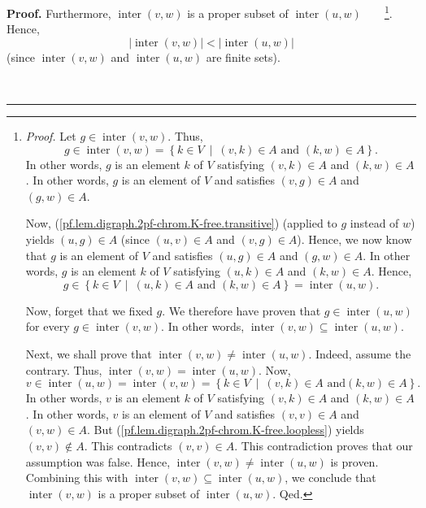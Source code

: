 \documentclass[numbers=enddot,12pt,final,onecolumn,notitlepage]{scrartcl}%
\theoremstyle{definition}
\newenvironment{proof}[1][Proof]{\noindent\textbf{#1.} }{\ \rule{0.5em}{0.5em}}
\newenvironment{verlong}{}{}
\begin{document}
\begin{verlong}
\begin{proof}
Furthermore, $\operatorname*{inter}\left(  v,w\right)  $ is a proper subset of
$\operatorname*{inter}\left(  u,w\right)  $\ \ \ \ \footnote{\textit{Proof.}
Let $g\in\operatorname*{inter}\left(  v,w\right)  $. Thus,%
\[
g\in\operatorname*{inter}\left(  v,w\right)  =\left\{  k\in V\ \mid\ \left(
v,k\right)  \in A\text{ and }\left(  k,w\right)  \in A\right\}  .
\]
In other words, $g$ is an element $k$ of $V$ satisfying $\left(  v,k\right)
\in A$ and $\left(  k,w\right)  \in A$. In other words, $g$ is an element of
$V$ and satisfies $\left(  v,g\right)  \in A$ and $\left(  g,w\right)  \in A$.
\par
Now, (\ref{pf.lem.digraph.2pf-chrom.K-free.transitive}) (applied to $g$
instead of $w$) yields $\left(  u,g\right)  \in A$ (since $\left(  u,v\right)
\in A$ and $\left(  v,g\right)  \in A$). Hence, we now know that $g$ is an
element of $V$ and satisfies $\left(  u,g\right)  \in A$ and $\left(
g,w\right)  \in A$. In other words, $g$ is an element $k$ of $V$ satisfying
$\left(  u,k\right)  \in A$ and $\left(  k,w\right)  \in A$. Hence,%
\[
g\in\left\{  k\in V\ \mid\ \left(  u,k\right)  \in A\text{ and }\left(
k,w\right)  \in A\right\}  =\operatorname*{inter}\left(  u,w\right)  .
\]
\par
Now, forget that we fixed $g$. We therefore have proven that $g\in
\operatorname*{inter}\left(  u,w\right)  $ for every $g\in
\operatorname*{inter}\left(  v,w\right)  $. In other words,
$\operatorname*{inter}\left(  v,w\right)  \subseteq\operatorname*{inter}%
\left(  u,w\right)  $.
\par
Next, we shall prove that $\operatorname*{inter}\left(  v,w\right)
\neq\operatorname*{inter}\left(  u,w\right)  $. Indeed, assume the contrary.
Thus, $\operatorname*{inter}\left(  v,w\right)  =\operatorname*{inter}\left(
u,w\right)  $. Now,%
\[
v\in\operatorname*{inter}\left(  u,w\right)  =\operatorname*{inter}\left(
v,w\right)  =\left\{  k\in V\ \mid\ \left(  v,k\right)  \in A\text{ and
}\left(  k,w\right)  \in A\right\}  .
\]
In other words, $v$ is an element $k$ of $V$ satisfying $\left(  v,k\right)
\in A$ and $\left(  k,w\right)  \in A$. In other words, $v$ is an element of
$V$ and satisfies $\left(  v,v\right)  \in A$ and $\left(  v,w\right)  \in A$.
But (\ref{pf.lem.digraph.2pf-chrom.K-free.loopless}) yields $\left(
v,v\right)  \notin A$. This contradicts $\left(  v,v\right)  \in A$. This
contradiction proves that our assumption was false. Hence,
$\operatorname*{inter}\left(  v,w\right)  \neq\operatorname*{inter}\left(
u,w\right)  $ is proven. Combining this with $\operatorname*{inter}\left(
v,w\right)  \subseteq\operatorname*{inter}\left(  u,w\right)  $, we conclude
that $\operatorname*{inter}\left(  v,w\right)  $ is a proper subset of
$\operatorname*{inter}\left(  u,w\right)  $. Qed.}. Hence,
\begin{equation}
\left\vert \operatorname*{inter}\left(  v,w\right)  \right\vert <\left\vert
\operatorname*{inter}\left(  u,w\right)  \right\vert
\label{pf.lem.digraph.2pf-chrom.K-free.c.ieq2}%
\end{equation}
(since $\operatorname*{inter}\left(  v,w\right)  $ and $\operatorname*{inter}%
\left(  u,w\right)  $ are finite sets).


\end{proof}
\end{verlong}
\end{document}

